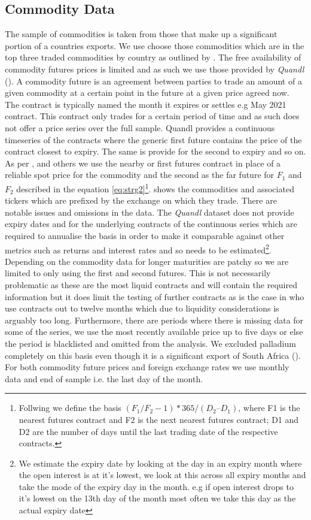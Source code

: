 \subsection{Commodity Data}
The sample of commodities is taken from those that make up a significant portion of a countries exports. We use choose those commodities which are in the top three traded commodities by country as outlined by \cite{codependency}.
The free availability of commodity futures prices is limited and as such we use those provided by \textit{Quandl} (\cite{quandl}).  A commodity future is an agreement between parties to trade an amount of a given commodity at a certain point in the future at a given price agreed now. The contract is typically named the month it expires or settles e.g May 2021 contract. This contract only trades for a certain period of time and as such does not offer a price series over the full sample. Quandl provides a continuous timeseries of the contracts where the generic first future contains the price of the contract closest to expiry. The same is provide for the second to expiry and so on. As per \cite{gorton2007}, \cite{famafrench} and others we use the nearby or first futures contract in place of a reliable spot price for the commodity and the second as the far future for $F_1$ and $F_2$ described in the equation \autoref{eq:strg2}\footnote{Follwing \cite{gorton2007} we define the basis $(F_1/F_2 -1) * 365/(D_2 – D_1)$, where F1 is the nearest futures
contract and F2 is the next nearest futures contract; D1 and D2 are the number of days until the last trading
date of the respective contracts.}.  shows the commodities and associated tickers which are prefixed by the exchange on which they trade. There are notable issues and omissions in the data. The \textit{Quandl} dataset does not provide expiry dates and for the underlying contracts of the continuous series which are required to annualise the basis in order to make it comparable against other metrics such as returns and interest rates and so needs to be estimated\footnote{We estimate the expiry date by looking at the day in an expiry month where the open interest is at it's lowest, we look at this across all expiry months and take the mode of the expiry day in the month. e.g if open interest drops to it's lowest on the 13th day of the month most often we take this day as the actual expiry date}. Depending on the commodity data for longer maturities are patchy so we are limited to only using the first and second futures. This is not necessarily problematic as these are the most liquid contracts and will contain the required information but it does limit the testing of further contracts as is the case in \cite{mainref} who use contracts out to twelve months which due to liquidity considerations is arguably too long. Furthermore, there are periods where there is missing data for some of the series, we use the most recently available price up to five days or else the period is blacklisted and omitted from the analysis. We excluded palladium completely on this basis even though it is a significant export of South Africa (\cite{codependency}). For both commodity future prices and foreign exchange rates we use monthly data and end of sample i.e. the last day of the month.


